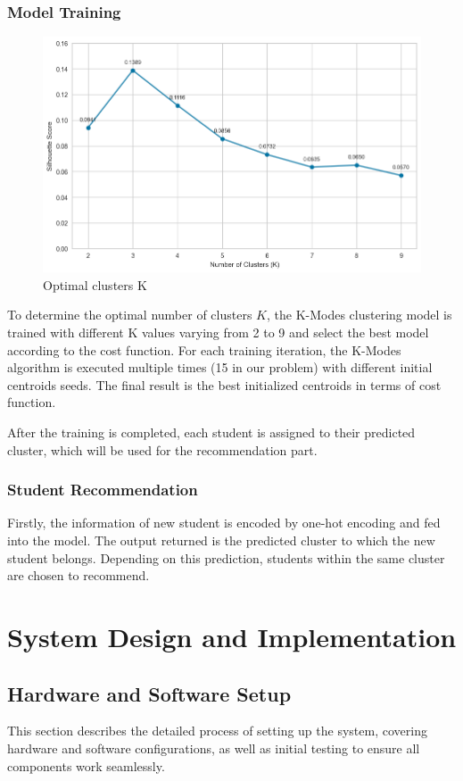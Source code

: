 \documentclass{article}
\begin{document}
\subsubsection{Model Training}
\begin{figure}[H]
    \centering
    \includegraphics[width=0.7\linewidth]{image/choosing_K.png}
    \caption{Optimal clusters K}
    \label{fig:choosing_K}
\end{figure}

To determine the optimal number of clusters $K$, the K-Modes clustering model is trained with different K values varying from 2 to 9 and select the best model according to the cost function. For each training iteration, the K-Modes algorithm is executed multiple times (15 in our problem) with different initial centroids seeds. The final result is the best initialized centroids in terms of cost function.\citep{devos2015}

After the training is completed, each student is assigned to their predicted cluster, which will be used for the recommendation part.

\subsubsection{Student Recommendation}
Firstly, the information of new student is encoded by one-hot encoding and fed into the model. The output returned is the predicted cluster to which the new student belongs. Depending on this prediction, students within the same cluster are chosen to recommend.

\section{System Design and Implementation}  

\subsection{Hardware and Software Setup}  
This section describes the detailed process of setting up the system, covering hardware and software configurations, as well as initial testing to ensure all components work seamlessly.
\end{document}
